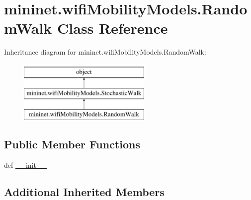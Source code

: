 \hypertarget{classmininet_1_1wifiMobilityModels_1_1RandomWalk}{\section{mininet.\-wifi\-Mobility\-Models.\-Random\-Walk Class Reference}
\label{classmininet_1_1wifiMobilityModels_1_1RandomWalk}
}
Inheritance diagram for mininet.\-wifi\-Mobility\-Models.\-Random\-Walk\-:\begin{figure}[H]
\begin{center}
\leavevmode
\includegraphics[height=3.000000cm]{classmininet_1_1wifiMobilityModels_1_1RandomWalk}
\end{center}
\end{figure}
\subsection*{Public Member Functions}
\begin{DoxyCompactItemize}
\item 
def \hyperlink{classmininet_1_1wifiMobilityModels_1_1RandomWalk_ae3af0b58f0622e21bcb5f427387ddca1}{\-\_\-\-\_\-init\-\_\-\-\_\-}
\end{DoxyCompactItemize}
\subsection*{Additional Inherited Members}


